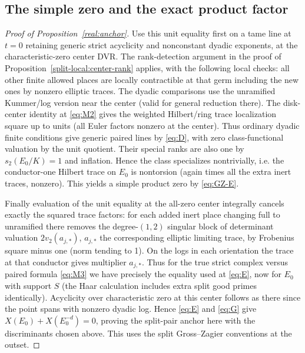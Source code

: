 \subsection{The simple zero and the exact product factor}

\begin{proof}[Proof of Proposition~\ref{real:anchor}]
Use this unit equality first on a tame line at \(t=0\) retaining generic strict acyclicity and nonconstant dyadic exponents, at the characteristic-zero center DVR. The rank-detection argument in the proof of Proposition~\ref{split-local:center-rank} applies, with the following local checks: all other finite allowed places are locally contractible at that germ including the new ones by nonzero elliptic traces. The dyadic comparisons use the unramified Kummer/log version near the center (valid for general reduction there). The disk-center identity at \eqref{eq:M2} gives the weighted Hilbert/ring trace localization square up to units (all Euler factors nonzero at the center). Thus ordinary dyadic finite conditions give generic paired lines by \eqref{eq:D}, with zero class-functional valuation by the unit quotient. Their special ranks are also one by \(s_2(E_0/K)=1\) and inflation. Hence the class specializes nontrivially, i.e. the conductor-one Hilbert trace on \(E_0\) is nontorsion (again times all the extra inert traces, nonzero). This yields a simple product zero by \eqref{eq:GZ-E}.

Finally evaluation of the unit equality at the all-zero center integrally cancels exactly the squared trace factors: for each added inert place changing full to unramified there removes the degree-\((1,2)\) singular block of determinant valuation \(2v_2(a_{j,*})\), \(a_{j,*}\) the corresponding elliptic limiting trace, by Frobenius square minus one (norm tending to 1). On the logs in each orientation the trace at that conductor gives multiplier \(a_{j,*}\). Thus for the true strict complex versus paired formula \eqref{eq:M3} we have precisely the equality used at \eqref{eq:E}, now for \(E_0\) with support \(S\) (the Haar calculation includes extra split good primes identically). Acyclicity over characteristic zero at this center follows as there since the point spans with nonzero dyadic log. Hence \eqref{eq:E} and \eqref{eq:G} give \(X(E_0)+X(E_0^{-d})=0\), proving the split-pair anchor here with the discriminants chosen above. This uses the split Gross--Zagier conventions at the outset.
\end{proof}
